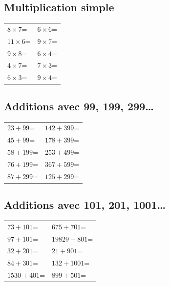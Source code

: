 \documentclass[answers]{exam}
\newcommand{\ex}[1]{#1\;=\;\dotfill}
\begin{document}
\subsection*{Multiplication simple}
\begin{center}
\begin{tabular}{|L|L|}
\hline
\ex{$8 \times 7$} & \ex{$6 \times 6$} \\
\ex{$11 \times 6$} & \ex{$9 \times 7$} \\
\ex{$9 \times 8$} & \ex{$6 \times 4$} \\
\ex{$4 \times 7$} & \ex{$7 \times 3$} \\
\ex{$6 \times 3$} & \ex{$9 \times 4$} \\
\hline
\end{tabular}
\end{center}


\subsection*{Additions avec 99, 199, 299…}
\begin{center}
\begin{tabular}{|L|L|}
\hline
\ex{$23+99$} & \ex{$142+399$} \\
\ex{$45+99$} & \ex{$178+399$} \\
\ex{$58+199$} & \ex{$253+499$} \\
\ex{$76+199$} & \ex{$367+599$} \\
\ex{$87+299$} & \ex{$125+299$} \\
\hline
\end{tabular}
\end{center}

\subsection*{Additions avec 101, 201, 1001…}
\begin{center}
\begin{tabular}{|L|L|}
\hline
\ex{$73+101$} & \ex{$675+701$} \\
\ex{$97+101$} & \ex{$19829+801$} \\
\ex{$32+201$} & \ex{$21+901$} \\
\ex{$84+301$} & \ex{$132+1001$} \\
\ex{$1530+401$} & \ex{$899+501$} \\
\hline
\end{tabular}
\end{center}
\end{document}
